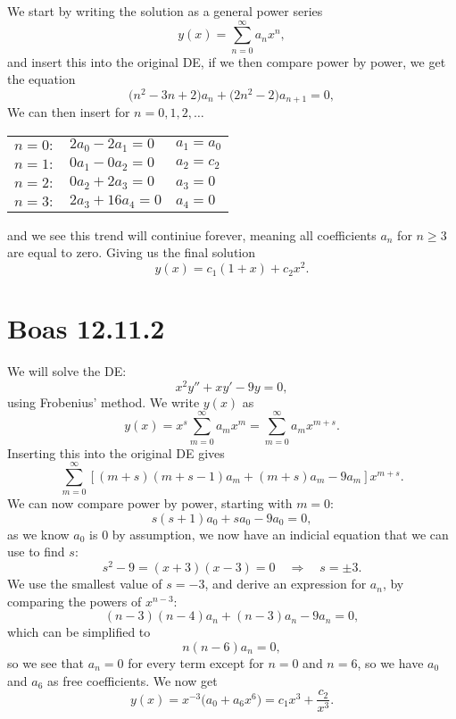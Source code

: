 \documentclass[a4paper, 11pt, titlepage, english]{article}
\newcommand{\To}{\quad\Rightarrow\quad}
\begin{document}
We start by writing the solution as a general power series
$$y(x) = \sum_{n=0}^\infty a_n x^n,$$
and insert this into the original DE, if we then compare power by power, we get the equation
$$\bigg(n^2 - 3n + 2\bigg)a_n + \bigg(2n^2 -2\bigg)a_{n+1} = 0,$$
We can then insert for $n=0,1,2,\ldots$

\begin{center}
\begin{tabular}{l | l | l}
$n = 0:$ & $2a_0 - 2a_1 = 0$ & $a_1 = a_0$\\
$n = 1:$ & $0a_1 - 0a_2 = 0$ & $a_2 = c_2$ \\
$n = 2:$ & $0a_2 + 2a_3 = 0$ & $a_3 = 0$ \\
$n = 3:$ & $2a_3 + 16a_4 = 0$ & $a_4 = 0$ \\ 
\end{tabular}
\end{center}

and we see this trend will continiue forever, meaning all coefficients $a_n$ for $n\geq3$ are equal to zero. Giving us the final solution
$$y(x) = c_1(1+x) + c_2x^2.$$



\clearpage

\section*{Boas 12.11.2}
We will solve the DE:
$$x^2y'' + xy' -9y = 0,$$
using Frobenius' method. We write $y(x)$ as
$$y(x) = x^s \sum_{m=0}^\infty a_m x^m = \sum_{m=0}^\infty a_m x^{m+s}.$$
Inserting this into the original DE gives
$$\sum_{m=0}^\infty [(m+s)(m+s-1)a_m + (m+s)a_m -9a_m]x^{m+s}.$$
We can now compare power by power, starting with $m=0$:
$$s(s+1)a_0 + sa_0 - 9a_0 = 0,$$
as we know $a_0$ is 0 by assumption, we now have an indicial equation that we can use to find $s$:
$$s^2 - 9 = (x+3)(x-3) = 0 \To s = \pm 3.$$
We use the smallest value of $s=-3$, and derive an expression for $a_n$, by comparing the powers of $x^{n-3}$:
$$(n-3)(n-4)a_n + (n-3)a_n -9 a_n = 0,$$
which can be simplified to
$$n(n-6)a_n = 0,$$
so we see that $a_n = 0$ for every term except for $n=0$ and $n=6$, so we have $a_0$ and $a_6$ as free coefficients. We now get
$$y(x) = x^{-3}\bigg(a_0 + a_6 x^6\bigg) = c_1 x^3 + \frac{c_2}{x^3}.$$
\end{document}
